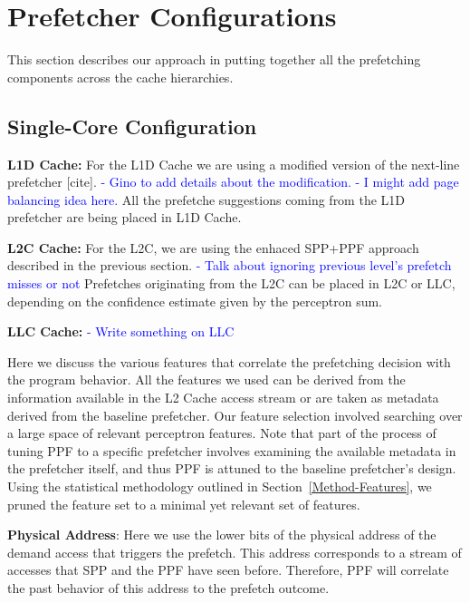 \section{Prefetcher Configurations}
\label{Config}

This section describes our approach in putting together all the prefetching 
components across the cache hierarchies.

\subsection{Single-Core Configuration}
\label{Config-Single}

\noindent \textbf{L1D Cache:}
For the L1D Cache we are using a modified version of the next-line prefetcher [cite].
\textcolor{blue}{
- Gino to add details about the modification.
- I might add page balancing idea here.
}
All the prefetche suggestions coming from the L1D prefetcher are being placed in L1D Cache.

\noindent \textbf{L2C Cache:}
For the L2C, we are using the enhaced SPP+PPF approach described in the previous section.
\textcolor{blue}{
- Talk about ignoring previous level's prefetch misses or not
}
Prefetches originating from the L2C can be placed in L2C or LLC, depending on the confidence
estimate given by the perceptron sum.

\noindent \textbf{LLC Cache:}
\textcolor{blue}{
- Write something on LLC
}




Here we discuss the various features that correlate the prefetching
decision with the program behavior.  All the features we used can be
derived from the information available in the L2 Cache access stream
or are taken as metadata derived from the baseline prefetcher.  Our
feature selection involved searching over a large space of relevant
perceptron features.  Note that part of the process of tuning PPF to a
specific prefetcher involves examining the available metadata in the
prefetcher itself, and thus PPF is attuned to the baseline
prefetcher's design. Using the statistical methodology outlined in
Section~\ref{Method-Features}, we pruned the feature set to a minimal
yet relevant set of features.

\noindent \textbf{Physical Address}: Here we use the lower bits 
of the physical address of 
the demand access that triggers the prefetch. This address corresponds 
to a  stream of accesses that SPP and the PPF have seen before. 
Therefore, PPF will correlate the past behavior of this address 
to the prefetch outcome. 

